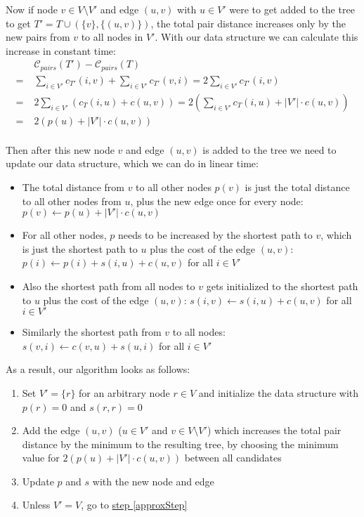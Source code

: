 \documentclass[a4paper, oneside]{discothesis}
\begin{document}
Now if node $v\in V\setminus V'$ and edge $(u,v)$ with $u\in V'$ were to get added to the tree to get $T'=T\cup(\{v\}, \{(u,v)\})$, the total pair distance increases only by the new pairs from $v$ to all nodes in $V'$. With our data structure we can calculate this increase in constant time:
\begin{equation}
\begin{split}
& \mathcal{C}_{pairs}(T')-\mathcal{C}_{pairs}(T) \\
=\;&\sum_{i\in V'}c_{T'}(i, v)+\sum_{i\in V'}c_{T'}(v, i)=2\sum_{i\in V'}c_{T'}(i, v) \\
=\;&2\sum_{i\in V'}\left(c_T(i,u)+c(u,v)\right)=2\left(\sum_{i\in V'}c_T(i,u)+|V'|\cdot c(u,v)\right) \\
=\;&2\left(p(u)+|V'|\cdot c(u,v)\right) \\
\end{split}
\end{equation}

Then after this new node $v$ and edge $(u,v)$ is added to the tree we need to update our data structure, which we can do in linear time:
\begin{itemize}
\item The total distance from $v$ to all other nodes $p(v)$ is just the total distance to all other nodes from $u$, plus the new edge once for every node: $p(v)\gets p(u)+|V'|\cdot c(u,v)$
\item For all other nodes, $p$ needs to be increased by the shortest path to $v$, which is just the shortest path to $u$ plus the cost of the edge $(u,v)$: $p(i)\gets p(i)+s(i,u)+c(u,v)$ for all $i\in V'$
\item Also the shortest path from all nodes to $v$ gets initialized to the shortest path to $u$ plus the cost of the edge $(u,v)$: $s(i,v)\gets s(i,u)+c(u,v)$ for all $i\in V'$
\item Similarly the shortest path from $v$ to all nodes: $s(v,i)\gets c(v,u)+s(u,i)$ for all $i\in V'$
\end{itemize}

As a result, our algorithm looks as follows:
\begin{enumerate}
\item Set $V'=\{r\}$ for an arbitrary node $r\in V$ and initialize the data structure with $p(r)=0$ and $s(r,r)=0$
\item Add the edge $(u,v)$ ($u\in V'$ and $v\in V\setminus V'$) which increases the total pair distance by the minimum to the resulting tree, by choosing the minimum value for $2\left(p(u)+|V'|\cdot c(u,v)\right)$ between all candidates
\label{approxStep}
\item Update $p$ and $s$ with the new node and edge
\item Unless $V'=V$, go to \hyperref[approxStep]{step \ref{approxStep}}
\end{enumerate}
\end{document}
